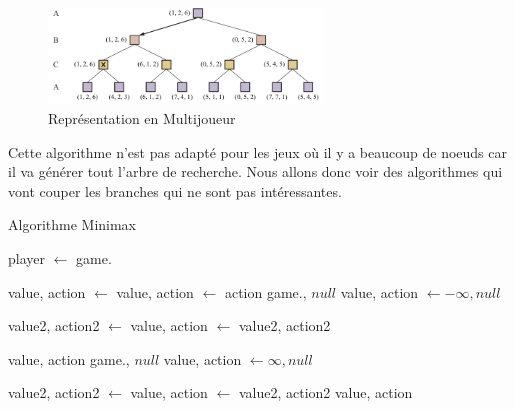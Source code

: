 \begin{figure}[H]
    \begin{center}
        \includegraphics[width=0.65\textwidth]{./pictures/multiminimax.png}
    \end{center}
    \caption{Représentation en Multijoueur}\label{fig:mutliminimax}
\end{figure}

Cette algorithme n'est pas adapté pour les jeux où il y a beaucoup de noeuds car il va générer tout l'arbre de recherche. 
Nous allons donc voir des algorithmes qui vont couper les branches qui ne sont pas intéressantes.
\begin{algorithm}[H]
    \caption{Algorithme Minimax}\label{alg:minimax}
    \begin{algorithmic}
        \State player $\leftarrow$ game.
        
            \State value, action $\leftarrow$  
        \Else 
            \State value, action $\leftarrow$ 
        \EndIf
        \State \Return action
        \EndFunction
        \vspace{0.5cm}
            \State \Return game., $null$
        \EndIf 
        \State value, action $\leftarrow -\infty, null$

            \State value2, action2 $\leftarrow$ 
                \State value, action $\leftarrow$ value2, action2
            \EndIf
        \EndFor

        \Return value, action
        \EndFunction
        \vspace{0.5cm}
            \State \Return game., $null$
        \EndIf 
        \State value, action $\leftarrow \infty, null$ 

        \State value2, action2 $\leftarrow$ %
                \State value, action $\leftarrow$ value2, action2 
            \EndIf
        \EndFor
        \State \Return value, action
        \EndFunction
    \end{algorithmic} 
\end{algorithm}
\newpage

